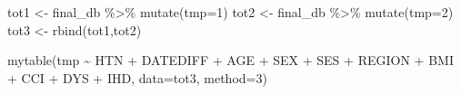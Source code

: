 \documentclass[
]{book}
\newenvironment{Shaded}{\begin{snugshade}}{\end{snugshade}}
\newcommand{\AttributeTok}[1]{\textcolor[rgb]{0.77,0.63,0.00}{#1}}
\newcommand{\DecValTok}[1]{\textcolor[rgb]{0.00,0.00,0.81}{#1}}
\newcommand{\FunctionTok}[1]{\textcolor[rgb]{0.00,0.00,0.00}{#1}}
\newcommand{\NormalTok}[1]{#1}
\newcommand{\OtherTok}[1]{\textcolor[rgb]{0.56,0.35,0.01}{#1}}
\newcommand{\SpecialCharTok}[1]{\textcolor[rgb]{0.00,0.00,0.00}{#1}}
\begin{document}
\begin{Shaded}
\begin{Highlighting}[]
\NormalTok{tot1 }\OtherTok{\textless{}{-}}\NormalTok{ final\_db }\SpecialCharTok{\%\textgreater{}\%} \FunctionTok{mutate}\NormalTok{(}\AttributeTok{tmp=}\DecValTok{1}\NormalTok{)}
\NormalTok{tot2 }\OtherTok{\textless{}{-}}\NormalTok{ final\_db }\SpecialCharTok{\%\textgreater{}\%} \FunctionTok{mutate}\NormalTok{(}\AttributeTok{tmp=}\DecValTok{2}\NormalTok{)}
\NormalTok{tot3 }\OtherTok{\textless{}{-}} \FunctionTok{rbind}\NormalTok{(tot1,tot2)}

\FunctionTok{mytable}\NormalTok{(tmp }\SpecialCharTok{\textasciitilde{}}\NormalTok{ HTN }\SpecialCharTok{+}\NormalTok{ DATEDIFF }\SpecialCharTok{+}\NormalTok{ AGE }\SpecialCharTok{+}\NormalTok{ SEX }\SpecialCharTok{+}\NormalTok{ SES }\SpecialCharTok{+}\NormalTok{ REGION }\SpecialCharTok{+}\NormalTok{ BMI }\SpecialCharTok{+}\NormalTok{ CCI }\SpecialCharTok{+}\NormalTok{ DYS }\SpecialCharTok{+}\NormalTok{ IHD, }\AttributeTok{data=}\NormalTok{tot3, }\AttributeTok{method=}\DecValTok{3}\NormalTok{)}
\end{Highlighting}
\end{Shaded}
\end{document}
